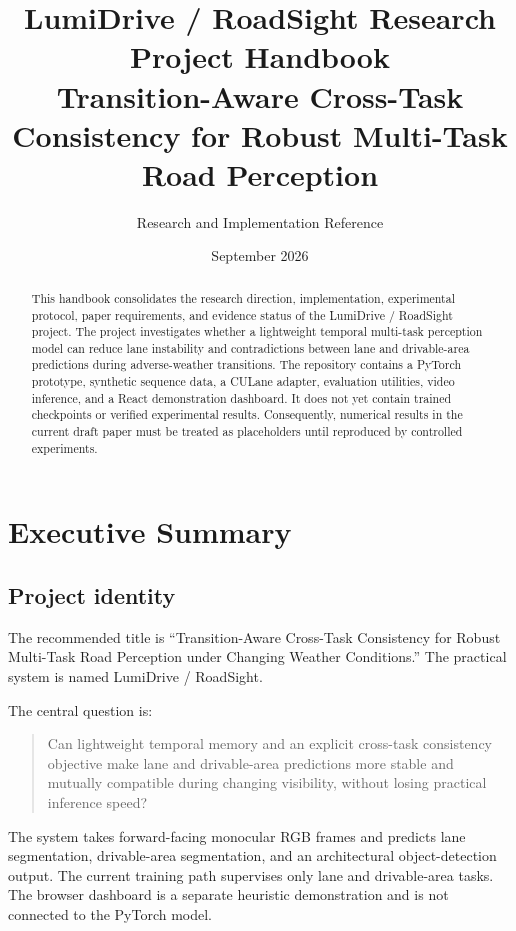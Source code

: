 \documentclass[11pt,a4paper]{article}
\title{\textbf{LumiDrive / RoadSight Research Project Handbook}\\
\large Transition-Aware Cross-Task Consistency for Robust Multi-Task Road Perception}
\author{Research and Implementation Reference}
\date{September 2026}
\begin{document}
\maketitle

\begin{abstract}
This handbook consolidates the research direction, implementation, experimental protocol, paper requirements, and evidence status of the LumiDrive / RoadSight project. The project investigates whether a lightweight temporal multi-task perception model can reduce lane instability and contradictions between lane and drivable-area predictions during adverse-weather transitions. The repository contains a PyTorch prototype, synthetic sequence data, a CULane adapter, evaluation utilities, video inference, and a React demonstration dashboard. It does not yet contain trained checkpoints or verified experimental results. Consequently, numerical results in the current draft paper must be treated as placeholders until reproduced by controlled experiments.
\end{abstract}

\tableofcontents
\newpage

\section{Executive Summary}

\subsection{Project identity}
The recommended title is ``Transition-Aware Cross-Task Consistency for Robust Multi-Task Road Perception under Changing Weather Conditions.'' The practical system is named LumiDrive / RoadSight.

The central question is:
\begin{quote}
Can lightweight temporal memory and an explicit cross-task consistency objective make lane and drivable-area predictions more stable and mutually compatible during changing visibility, without losing practical inference speed?
\end{quote}

The system takes forward-facing monocular RGB frames and predicts lane segmentation, drivable-area segmentation, and an architectural object-detection output. The current training path supervises only lane and drivable-area tasks. The browser dashboard is a separate heuristic demonstration and is not connected to the PyTorch model.
\end{document}
